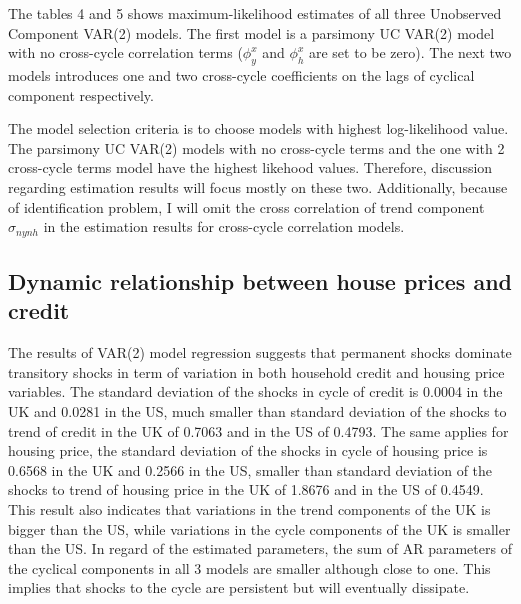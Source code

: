 \documentclass[
  12pt,
]{article}
\begin{document}
        \clearpage
        
            
        The tables 4 and 5 shows maximum-likelihood estimates of all three Unobserved Component VAR(2) models. The first model is a parsimony UC VAR(2) model with no cross-cycle correlation terms ($\phi^x_y$ and $\phi^x_h$ are set to be zero). The next two models introduces one and two cross-cycle coefficients on the lags of cyclical component respectively. 
        
        The model selection criteria is to choose models with highest log-likelihood value. The parsimony UC VAR(2) models with no cross-cycle terms and the one with 2 cross-cycle terms model have the highest likehood values. Therefore, discussion regarding estimation results will focus mostly on these two. Additionally, because of identification problem, I will omit the cross correlation of trend component $\sigma_{nynh}$ in the estimation results for cross-cycle correlation models.
        
        \subsection{Dynamic relationship between house prices and credit}
        
        The results of VAR(2) model regression suggests that permanent shocks dominate transitory shocks in term of variation in both household credit and housing price variables. The standard deviation of the shocks in cycle of credit is 0.0004 in the UK and 0.0281 in the US, much smaller than standard deviation of the shocks to trend of credit in the UK of 0.7063 and in the US of 0.4793. The same applies for housing price, the standard deviation of the shocks in cycle of housing price is 0.6568 in the UK and 0.2566 in the US, smaller than standard deviation of the shocks to trend of housing price in the UK of 1.8676 and in the US of 0.4549. This result also indicates that variations in the trend components of the UK is bigger than the US, while variations in the cycle components of the UK is smaller than the US. In regard of the estimated parameters, the sum of AR parameters of the cyclical components in all 3 models are smaller although close to one. This implies that shocks to the cycle are persistent but will eventually dissipate.
        
\end{document}
